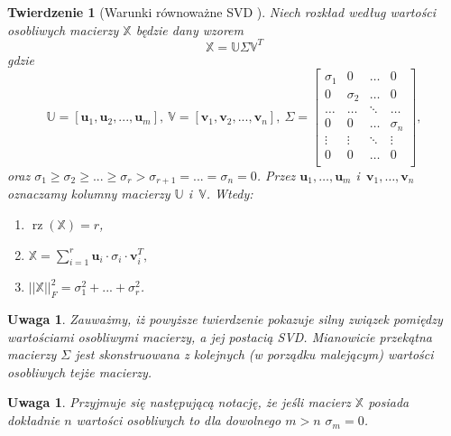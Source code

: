 \documentclass[12pt,a4paper]{report}
\newtheorem{tw}[df]{Twierdzenie}
\newtheorem{uwaga}[df]{Uwaga}
\newcommand{\rz}[1]{\operatorname{rz}\left({#1} \right)}
\begin{document}
\begin{tw}[Warunki równoważne SVD {\citep{ulafiir}}]%
Niech rozkład według wartości osobliwych macierzy $\mathbb{X}$ będzie dany wzorem
$$
\mathbb{X}=\mathbb{U} \Sigma \mathbb{V}^T
$$
gdzie 
$$\mathbb{U}=[\mathbf{u}_1,\mathbf{u}_2,...,\mathbf{u}_m], \: \mathbb{V} = [\mathbf{v}_1,\mathbf{v}_2,...,\mathbf{v}_n], \: \Sigma = \left[
        \begin{array}{cccc}
         \sigma_{1} & 0 & \ldots & 0 \\
         0 & \sigma_{2} & \ldots & 0 \\
         \ldots & \ldots& \ddots & \ldots \\
         0 & 0 & \ldots & \sigma_{n} \\
         \vdots & \vdots & \ddots & \vdots \\
         0 & 0 & \ldots & 0 \\
         \end{array}
      \right],$$
oraz 
$\sigma_{1}\geq \sigma_{2} \geq ... \geq \sigma_{r} > \sigma_{r+1} = ... = \sigma_{n} = 0$. Przez $\mathbf{u}_1, \ldots, \mathbf{u}_m$ i~$\mathbf{v}_1, \ldots, \mathbf{v}_n$ oznaczamy kolumny macierzy $\mathbb{U}$ i~$\mathbb{V}$.
Wtedy:
\begin{enumerate}
\item $\rz{\mathbb{X}} = r$, 
\item $\mathbb{X} = \sum_{i=1}^r \mathbf{u}_i \cdot\sigma_i \cdot \mathbf{v}_i^T,$
\item $||\mathbb{X}||_F^2 = \sigma_{1}^2+...+\sigma_{r}^2$.
\end{enumerate}
\end{tw}

\begin{uwaga}
Zauważmy, iż powyższe twierdzenie pokazuje silny związek pomiędzy wartościami osobliwymi macierzy, a jej postacią SVD. Mianowicie przekątna macierzy $\Sigma$ jest skonstruowana z kolejnych (w porządku malejącym) wartości osobliwych tejże macierzy.
\end{uwaga}

\begin{uwaga}
Przyjmuje się następującą notację, że jeśli macierz $\mathbb{X}$ posiada dokładnie $n$ wartości osobliwych to dla dowolnego $m > n$ $\sigma_m = 0$.
\end{uwaga}
\end{document}
